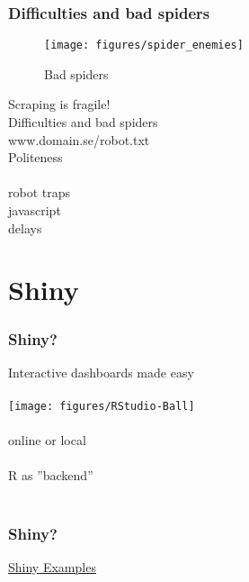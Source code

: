\documentclass{beamer}
\begin{document}
\begin{frame}
	\frametitle{Difficulties and bad spiders}
	\begin{wrapfigure}{r}{0.3\textwidth}
		\begin{center}
			\texttt{[image: figures/spider\_enemies]}
		\end{center}
		\caption{Bad spiders}
	\end{wrapfigure}
	Scraping is fragile! \\
	Difficulties and bad spiders \\
	www.domain.se/robot.txt \\
	Politeness \\~\\
	robot traps \\
	javascript \\
	delays \\
\end{frame}

\section{Shiny}

\begin{frame}
	\frametitle{Shiny?}
	\begin{center}
		Interactive dashboards made easy \\~\\
		\texttt{[image: figures/RStudio-Ball]} \\~\\
		online or local \\~\\
		R as ''backend'' \\~\\
	\end{center}
\end{frame}

\begin{frame}
	\frametitle{Shiny?}
	\begin{center}
	\href{https://www.rstudio.com/products/shiny/shiny-user-showcase/}{Shiny 
		Examples}
	\end{center}
\end{frame}
\end{document}
